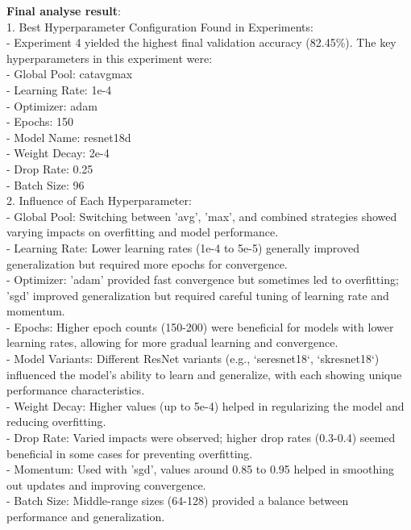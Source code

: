 \documentclass{article}
\begin{document}
\begin{tcolorbox}[enhanced jigsaw,breakable,pad at break*=1mm,
  colback=blue!5!white,colframe=blue!75!black,title=GPT-4 Experimental Logs,
  watermark color=white]
\textbf{Final analyse result}:\\
1. Best Hyperparameter Configuration Found in Experiments: \\
- Experiment 4 yielded the highest final validation accuracy (82.45\%). The key hyperparameters in this experiment were: \\
  - Global Pool: catavgmax \\
  - Learning Rate: 1e-4 \\
  - Optimizer: adam \\
  - Epochs: 150 \\
  - Model Name: resnet18d \\
  - Weight Decay: 2e-4 \\
  - Drop Rate: 0.25 \\
  - Batch Size: 96 \\

2. Influence of Each Hyperparameter: \\
- Global Pool: Switching between 'avg', 'max', and combined strategies showed varying impacts on overfitting and model performance. \\
- Learning Rate: Lower learning rates (1e-4 to 5e-5) generally improved generalization but required more epochs for convergence. \\
- Optimizer: 'adam' provided fast convergence but sometimes led to overfitting; 'sgd' improved generalization but required careful tuning of learning rate and momentum. \\
- Epochs: Higher epoch counts (150-200) were beneficial for models with lower learning rates, allowing for more gradual learning and convergence. \\
- Model Variants: Different ResNet variants (e.g., `seresnet18`, `skresnet18`) influenced the model's ability to learn and generalize, with each showing unique performance characteristics. \\
- Weight Decay: Higher values (up to 5e-4) helped in regularizing the model and reducing overfitting. \\
- Drop Rate: Varied impacts were observed; higher drop rates (0.3-0.4) seemed beneficial in some cases for preventing overfitting. \\
- Momentum: Used with 'sgd', values around 0.85 to 0.95 helped in smoothing out updates and improving convergence. \\
- Batch Size: Middle-range sizes (64-128) provided a balance between performance and generalization. \\



\end{tcolorbox}
\end{document}
